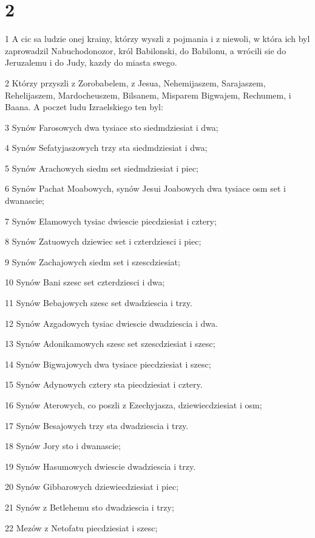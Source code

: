 \chapter{2}

\par 1 A cic sa ludzie onej krainy, którzy wyszli z pojmania i z niewoli, w która ich byl zaprowadzil Nabuchodonozor, król Babilonski, do Babilonu, a wrócili sie do Jeruzalemu i do Judy, kazdy do miasta swego.
\par 2 Którzy przyszli z Zorobabelem, z Jesua, Nehemijaszem, Sarajaszem, Rehelijaszem, Mardocheuszem, Bilsanem, Misparem Bigwajem, Rechumem, i Baana. A poczet ludu Izraelskiego ten byl:
\par 3 Synów Farosowych dwa tysiace sto siedmdziesiat i dwa;
\par 4 Synów Sefatyjaszowych trzy sta siedmdziesiat i dwa;
\par 5 Synów Arachowych siedm set siedmdziesiat i piec;
\par 6 Synów Pachat Moabowych, synów Jesui Joabowych dwa tysiace osm set i dwanascie;
\par 7 Synów Elamowych tysiac dwiescie piecdziesiat i cztery;
\par 8 Synów Zatuowych dziewiec set i czterdziesci i piec;
\par 9 Synów Zachajowych siedm set i szescdziesiat;
\par 10 Synów Bani szesc set czterdziesci i dwa;
\par 11 Synów Bebajowych szesc set dwadziescia i trzy.
\par 12 Synów Azgadowych tysiac dwiescie dwadziescia i dwa.
\par 13 Synów Adonikamowych szesc set szescdziesiat i szesc;
\par 14 Synów Bigwajowych dwa tysiace piecdziesiat i szesc;
\par 15 Synów Adynowych cztery sta piecdziesiat i cztery.
\par 16 Synów Aterowych, co poszli z Ezechyjasza, dziewiecdziesiat i osm;
\par 17 Synów Besajowych trzy sta dwadziescia i trzy.
\par 18 Synów Jory sto i dwanascie;
\par 19 Synów Hasumowych dwiescie dwadziescia i trzy.
\par 20 Synów Gibbarowych dziewiecdziesiat i piec;
\par 21 Synów z Betlehemu sto dwadziescia i trzy;
\par 22 Mezów z Netofatu piecdziesiat i szesc;
